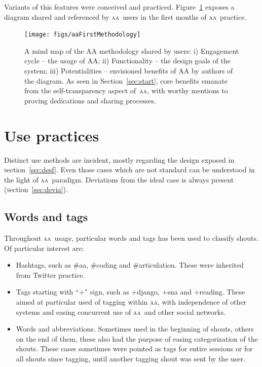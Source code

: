 \documentclass[a4paper, 11pt]{article} %
\newcommand{\sectionb}{\textsc{s}ection}
\newcommand{\aab}{\textsc{aa}}
\begin{document}
Variants of this features were conceived and practiced. Figure~\ref{fig:consult} exposes a diagram shared and referenced by \aab\ users in the first months of \aab\ practice.


\begin{figure}[!h]
    \centering
    \texttt{[image: figs/aaFirstMethodology]}
    \caption{A mind map of the AA methodology shared by users: i) Engagement cycle – the usage of AA; ii) Functionality – the design goals of the system; iii) Potentialities – envisioned benefits of AA by authors of the diagram. As seen in Section~\ref{sec:start}, core benefits emanate from the self-transparency aspect of~\aab, with worthy mentions to proving dedications and sharing processes.} 
    \label{fig:consult}
\end{figure}




\section{Use practices}\label{sec:use}
Distinct use methods are incident, mostly regarding the design exposed in \sectionb~\ref{sec:desf}. Even those cases which are not standard can be understood in the light of \aab\ paradigm. Deviations from the ideal case is always present (\sectionb~\ref{sec:devia}).

\subsection{Words and tags}\label{sec:usewt}
Throughout \aab\ usage, particular words and tags has been used to classify shouts. Of particular interest are:
\begin{itemize}
    \item Hashtags, such as \#aa, \#coding and \#articulation. These were inherited from Twitter practice. 
    \item Tags starting with ``+'' sign, such as +django, +sna and +reading. These aimed at particular used of tagging within \aab, with independence of other systems and easing concurrent use of \aab\ and other social networks.
    \item Words and abbreviations. Sometimes used in the beginning of shouts, others on the end of them, these also had the purpose of easing categorization of the shouts. These cases sometimes were pointed as tags for entire sessions or for all shouts since tagging, until another tagging shout was sent by the user.
\end{itemize}
\end{document}
